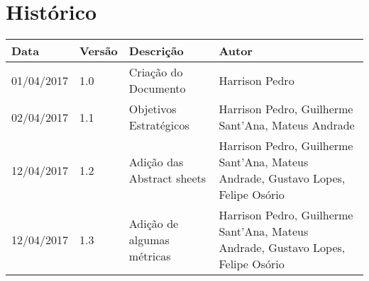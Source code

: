 \chapter{Histórico}

\begin{tabular}{ |p{3cm}|p{3cm}|p{3cm}|p{3cm}|  }
 \hline
 Data 		& 		Versão & 		Descrição 			& 		Autor\\
 \hline\hline
 01/04/2017 & 		1.0    &		Criação do Documento &   	Harrison Pedro \\ 
 \hline
 02/04/2017 & 		1.1    &		Objetivos Estratégicos &   	Harrison Pedro, Guilherme Sant'Ana, Mateus Andrade \\ 
 \hline
 12/04/2017 & 		1.2    &		Adição das Abstract sheets  &   	Harrison Pedro, Guilherme Sant'Ana, Mateus Andrade, Gustavo Lopes, Felipe Osório \\ 
 \hline
 12/04/2017 & 		1.3    &		Adição de algumas métricas  &   	Harrison Pedro, Guilherme Sant'Ana, Mateus Andrade, Gustavo Lopes, Felipe Osório \\ 
 \hline

\end{tabular}

